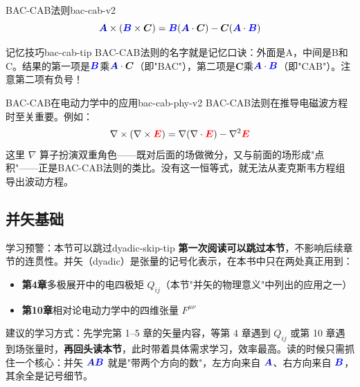 \documentclass[11pt,a4paper,openany,oneside]{book}
\newcommand{\vecE}{\textcolor{red}{\vect{E}}}
\newcommand{\vecB}{\textcolor{blue}{\vect{B}}}
\newcommand{\vecA}{\textcolor{blue!70!black}{\vect{A}}}
\newcommand{\vect}[1]{\bm{#1}}
\newcommand{\grad}{\nabla}
\newcommand{\curl}{\nabla\times}
\newcommand{\divg}{\nabla\cdot}
\newcommand{\lap}{\nabla^2}
\begin{document}
\begin{theorem}{BAC-CAB法则}{bac-cab-v2}
\[
{\vecA}\times({\vecB}\times{\vect{C}}) = \vecB(\vecA \cdot \vect{C}) - \vect{C}(\vecA \cdot \vecB)
\]
\end{theorem}

\begin{tip}{记忆技巧}{bac-cab-tip}
BAC-CAB法则的名字就是记忆口诀：外面是A，中间是B和C。结果的第一项是$\vecB$乘$\vecA\cdot\vect{C}$（即"BAC"），第二项是$\vect{C}$乘$\vecA\cdot\vecB$（即"CAB"）。注意第二项有负号！
\end{tip}

\begin{insight}{BAC-CAB在电动力学中的应用}{bac-cab-phy-v2}
BAC-CAB法则在推导电磁波方程时至关重要。例如：
\[
\curl(\curl\vecE) = \grad(\divg\vecE) - \lap\vecE
\]
这里 $\nabla$ 算子扮演双重角色——既对后面的场做微分，又与前面的场形成"点积"——正是BAC-CAB法则的类比。没有这一恒等式，就无法从麦克斯韦方程组导出波动方程。
\end{insight}

\subsection{并矢基础}

\begin{tip}{学习预警：本节可以跳过}{dyadic-skip-tip}
\textbf{第一次阅读可以跳过本节}，不影响后续章节的连贯性。并矢（dyadic）是张量的记号化表示，在本书中只在两处真正用到：
\begin{itemize}[nosep]
\item \textbf{第4章}多极展开中的电四极矩 $Q_{ij}$（本节"并矢的物理意义"中列出的应用之一）
\item \textbf{第10章}相对论电动力学中的四维张量 $F^{\mu\nu}$
\end{itemize}
建议的学习方式：先学完第 1--5 章的矢量内容，等第 4 章遇到 $Q_{ij}$ 或第 10 章遇到场张量时，\textbf{再回头读本节}，此时带着具体需求学习，效率最高。读的时候只需抓住一个核心：并矢 $\vecA\vecB$ 就是"带两个方向的数"，左方向来自 $\vecA$、右方向来自 $\vecB$，其余全是记号细节。
\end{tip}
\end{document}
